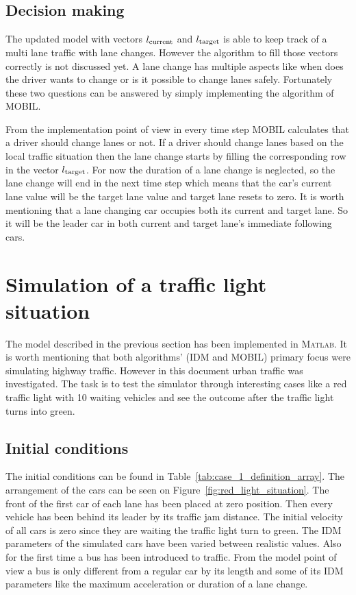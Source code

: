 		\subsection*{Decision making}
		The updated model with vectors $l_{\rm current}$ and $l_{\rm target}$ is able to keep track of a multi lane traffic with lane changes. However the algorithm to fill those vectors correctly is not discussed yet. A lane change has multiple aspects like when does the driver wants to change or is it possible to change lanes safely. Fortunately these two questions can be answered by simply implementing the algorithm of MOBIL.

		From the implementation point of view in every time step MOBIL calculates that a driver should change lanes or not. If a driver should change lanes based on the local traffic situation then the lane change starts by filling the corresponding row in the vector $l_{\rm target}$. For now the duration of a lane change is neglected, so the lane change will end in the next time step which means that the car's current lane value will be the target lane value and target lane resets to zero. It is worth mentioning that a lane changing car occupies both its current and target lane. So it will be the leader car in both current and target lane's immediate following cars.
	\section{Simulation of a traffic light situation}
		The model described in the previous section has been implemented in \textsc{Matlab}. It is worth mentioning that both algorithms' (IDM and MOBIL) primary focus were simulating highway traffic. However in this document urban traffic was investigated. The task is to test the simulator through interesting cases like a red traffic light with 10 waiting vehicles and see the outcome after the traffic light turns into green.
		
		\subsection*{Initial conditions}
		The initial conditions can be found in Table~\ref{tab:case_1_definition_array}. The arrangement of the cars can be seen on Figure~\ref{fig:red_light_situation}. The front of the first car of each lane has been placed at zero position. Then every vehicle has been behind its leader by its traffic jam distance. The initial velocity of all cars is zero since they are waiting the traffic light turn to green. The IDM parameters of the simulated cars have been varied between realistic values. Also for the first time a bus has been introduced to traffic. From the model point of view a bus is only different from a regular car by its length and some of its IDM parameters like the maximum acceleration or duration of a lane change.
		
